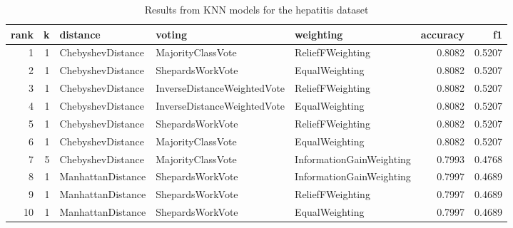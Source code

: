 \begin{table}
\caption{Results from KNN models for the hepatitis dataset}
\begin{tabular}{rrlllrr}
\toprule
rank & k & distance & voting & weighting & accuracy & f1 \\
\midrule
1 & 1 & ChebyshevDistance & MajorityClassVote & ReliefFWeighting & 0.8082 & 0.5207 \\
2 & 1 & ChebyshevDistance & ShepardsWorkVote & EqualWeighting & 0.8082 & 0.5207 \\
3 & 1 & ChebyshevDistance & InverseDistanceWeightedVote & ReliefFWeighting & 0.8082 & 0.5207 \\
4 & 1 & ChebyshevDistance & InverseDistanceWeightedVote & EqualWeighting & 0.8082 & 0.5207 \\
5 & 1 & ChebyshevDistance & ShepardsWorkVote & ReliefFWeighting & 0.8082 & 0.5207 \\
6 & 1 & ChebyshevDistance & MajorityClassVote & EqualWeighting & 0.8082 & 0.5207 \\
7 & 5 & ChebyshevDistance & MajorityClassVote & InformationGainWeighting & 0.7993 & 0.4768 \\
8 & 1 & ManhattanDistance & ShepardsWorkVote & InformationGainWeighting & 0.7997 & 0.4689 \\
9 & 1 & ManhattanDistance & ShepardsWorkVote & ReliefFWeighting & 0.7997 & 0.4689 \\
10 & 1 & ManhattanDistance & ShepardsWorkVote & EqualWeighting & 0.7997 & 0.4689 \\
\bottomrule
\end{tabular}
\end{table}
